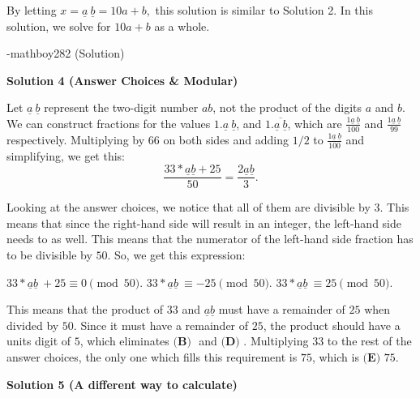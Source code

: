 \begin{enumerate}
 By letting $x=\underline{a} \ \underline{b}=10a+b,$ this solution is similar to Solution 2. In this solution, we solve for $10a+b$ as a whole.

 -mathboy282 (Solution)

 



\textbf{Solution 4 (Answer Choices \& Modular)}

Let $\underline{a} \ \underline{b}$ represent the two-digit number $ab$, not the product of the digits $a$ and $b$. We can construct fractions for the values $1.\underline{a} \ \underline{b}$, and $1.\overline{\underline{a} \ \underline{b}}$, which are $\frac{1\underline{a} \ \underline{b}}{100}$ and $\frac{1\underline{a} \ \underline{b}}{99}$  respectively. Multiplying by $66$ on both sides and adding $1/2$ to $\frac{1\underline{a} \ \underline{b}}{100}$ and simplifying, we get this: 
 \[\frac{33 * \underline{a}\underline{b} + 25}{50} = \frac{2\underline{a}\underline{b}}{3}.\]

 Looking at the answer choices, we notice that all of them are divisible by $3$. This means that since the right-hand side will result in an integer, the left-hand side needs to as well. This means that the numerator of the left-hand side fraction has to be divisible by $50$. So, we get this expression:

 $33 * \underline{a}\underline{b}\ + 25 \equiv 0\pmod{50}.$
$33 * \underline{a}\underline{b}\ \equiv -25\pmod{50}.$
$33 * \underline{a}\underline{b}\ \equiv 25\pmod{50}.$

 This means that the product of $33$ and $\underline{a}\underline{b}$ must have a remainder of $25$ when divided by $50$. Since it must have a remainder of $25$, the product should have a units digit of $5$, which eliminates $\textbf{(B) }$ and $\textbf{(D) }$. Multiplying $33$ to the rest of the answer choices, the only one which fills this requirement is $75$, which is $\boxed{\textbf{(E) }75}.$




\textbf{Solution 5 (A different way to calculate)}


\end{enumerate}
